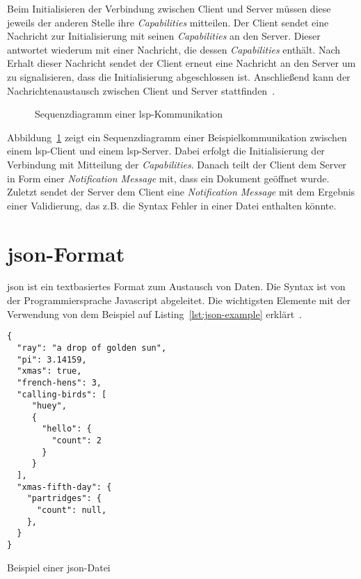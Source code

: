 Beim Initialisieren der Verbindung zwischen Client und Server müssen diese jeweils der anderen Stelle ihre \textit{Capabilities} mitteilen.
Der Client sendet eine Nachricht zur Initialisierung mit seinen \textit{Capabilities} an den Server.
Dieser antwortet wiederum mit einer Nachricht, die dessen \textit{Capabilities} enthält.
Nach Erhalt dieser Nachricht sendet der Client erneut eine Nachricht an den Server um zu signalisieren, dass die Initialisierung abgeschlossen ist.
Anschließend kann der Nachrichtenaustausch zwischen Client und Server stattfinden~\cite{lsp-microsoft,lsp-medium}.

\begin{figure}[htp] %
      \centering
      \caption{Sequenzdiagramm einer \acs{lsp}-Kommunikation}
      \label{fig:lsp-sequence-diagram}
\end{figure}

Abbildung~\ref{fig:lsp-sequence-diagram} zeigt ein Sequenzdiagramm einer Beispielkommunikation zwischen einem \ac{lsp}-Client und einem \ac{lsp}-Server.
Dabei erfolgt die Initialisierung der Verbindung mit Mitteilung der \textit{Capabilities}.
Danach teilt der Client dem Server in Form einer \textit{Notification Message} mit, dass ein Dokument geöffnet wurde.
Zuletzt sendet der Server dem Client eine \textit{Notification Message} mit dem Ergebnis einer Validierung, das z.B. die Syntax Fehler in einer Datei enthalten könnte.


\section{\acs{json}-Format}\label{sec:json-format}

\ac{json} ist ein textbasiertes Format zum Austausch von Daten. Die Syntax ist von der Programmiersprache Javascript abgeleitet.
Die wichtigsten Elemente mit der Verwendung von dem Beispiel auf Listing~\ref{lst:json-example} erklärt~\cite{json-org,json-developer-mozilla}.

\begin{listing}[htp]
      \begin{verbatim}
{
  "ray": "a drop of golden sun",
  "pi": 3.14159,
  "xmas": true,
  "french-hens": 3,
  "calling-birds": [
     "huey",
     {
       "hello": {
         "count": 2
       }
     }    
  ],
  "xmas-fifth-day": {
    "partridges": {
      "count": null,
    },
  }
}
      \end{verbatim}
      \caption{Beispiel einer \acs{json}-Datei}
      \label{lst:json-example}
\end{listing}

